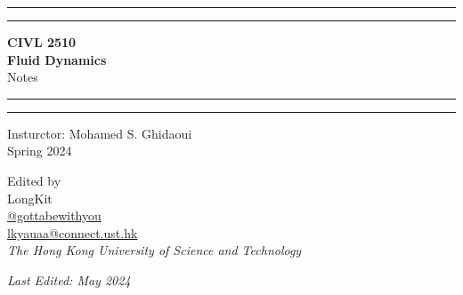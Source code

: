 \documentclass[twoside]{article}
\numberwithin{equation}{section}
\begin{document}
	\begin{titlepage}
		\centering
		\scshape
		\vspace*{\baselineskip}
		
		\rule{\textwidth}{1.6pt}\vspace{-\baselineskip}\vspace{2pt} %
		\rule{\textwidth}{0.4pt} %
		
		\vspace{0.5\baselineskip}
		
		{\LARGE \textbf{CIVL 2510 \\ Fluid Dynamics} \\
			
			\vspace{0.75\baselineskip}
			\Large Notes}
		
		\vspace{0.5\baselineskip}
		
		\rule{\textwidth}{0.4pt}\vspace{-\baselineskip}\vspace{3.2pt} %
		\rule{\textwidth}{1.6pt} %
		
		\vspace{1.5\baselineskip}
		
		{\large Insturctor: Mohamed S. Ghidaoui \\
			\vspace{0.5\baselineskip} Spring 2024}
		
		\vspace{\baselineskip}
		
		{\Large Edited by \\
			\vspace{0.5\baselineskip}
			\Large LongKit \\
			\vspace{0.5\baselineskip}
			\small \normalfont \href{https://github.com/gottabewithyou}{\faGithub \hspace{2.5pt} @gottabewithyou} \\
			\small \normalfont \href{mailto:lkyauaa@connect.ust.hk}{\faEnvelope \hspace{2.5pt} lkyauaa@connect.ust.hk} \\
			\vspace{10pt}
			\large \textit{The Hong Kong University of Science and Technology}}
		
		\vspace{10\baselineskip}
		
		\textit{Last Edited: May 2024}
		
	\end{titlepage}
	
\end{document}
